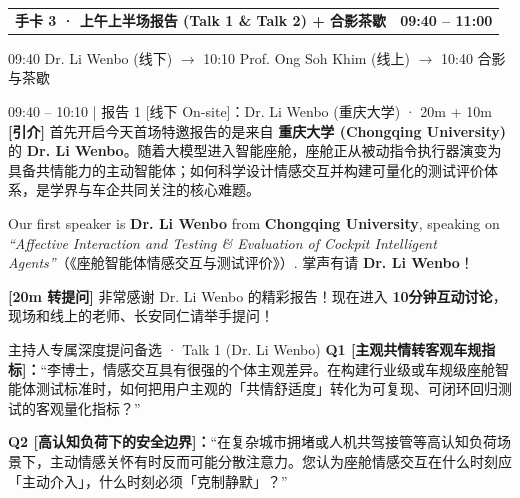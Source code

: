 \documentclass[12pt,a4paper]{article}
\makeatletter
\newcommand{\cardbanner}[3]{%
  \begin{tcolorbox}[
    enhanced, colback=nusnavy, colframe=nusnavy, arc=1.8mm,
    boxrule=0pt, left=3.8mm, right=3.8mm, top=2.1mm, bottom=2.2mm,
    before skip=0pt, after skip=2.4mm,
    borderline south={1.1mm}{0mm}{nusorange}
  ]
    \begin{tabularx}{\linewidth}{@{}X r@{}}
      {\fontsize{13.2}{16}\selectfont\color{white}\textbf{#1}} &
      {\fontsize{11.2}{14}\selectfont\color{orangebg}\textbf{#2}}
    \end{tabularx}
    \vspace{0.6mm}
    {\fontsize{9.3}{11.8}\selectfont\color{slate200}#3}
  \end{tcolorbox}
}
\makeatother
\begin{document}
\newpage

\cardbanner{手卡 3 · 上午上半场报告 (Talk 1 \& Talk 2) + 合影茶歇}{09:40 – 11:00}{09:40 Dr. Li Wenbo (线下) $\rightarrow$ 10:10 Prof. Ong Soh Khim (线上) $\rightarrow$ 10:40 合影与茶歇}

\begin{scriptbox}{09:40 – 10:10 \;|\; 报告 1 [线下 On-site]：Dr. Li Wenbo (重庆大学) · 20m + 10m}
\fontsize{11.1}{15.8}\selectfont
\textbf{[引介]} 首先开启今天首场特邀报告的是来自 \textbf{重庆大学 (Chongqing University)} 的 \textbf{Dr. Li Wenbo}。随着大模型进入智能座舱，座舱正从被动指令执行器演变为具备共情能力的主动智能体；如何科学设计情感交互并构建可量化的测试评价体系，是学界与车企共同关注的核心难题。\par
Our first speaker is \textbf{Dr. Li Wenbo} from \textbf{Chongqing University}, speaking on \textit{``Affective Interaction and Testing \& Evaluation of Cockpit Intelligent Agents''}（《座舱智能体情感交互与测试评价》）. 掌声有请 \textbf{Dr. Li Wenbo}！\par
\textbf{[20m 转提问]} 非常感谢 Dr. Li Wenbo 的精彩报告！现在进入 \textbf{10分钟互动讨论}，现场和线上的老师、长安同仁请举手提问！
\end{scriptbox}
\begin{qabox}{主持人专属深度提问备选 · Talk 1 (Dr. Li Wenbo)}
\fontsize{10.2}{14.4}\selectfont
\textbf{Q1 [主观共情转客观车规指标]：}“李博士，情感交互具有很强的个体主观差异。在构建行业级或车规级座舱智能体测试标准时，如何把用户主观的「共情舒适度」转化为可复现、可闭环回归测试的客观量化指标？”\par
\textbf{Q2 [高认知负荷下的安全边界]：}“在复杂城市拥堵或人机共驾接管等高认知负荷场景下，主动情感关怀有时反而可能分散注意力。您认为座舱情感交互在什么时刻应「主动介入」，什么时刻必须「克制静默」？”
\end{qabox}
\end{document}
